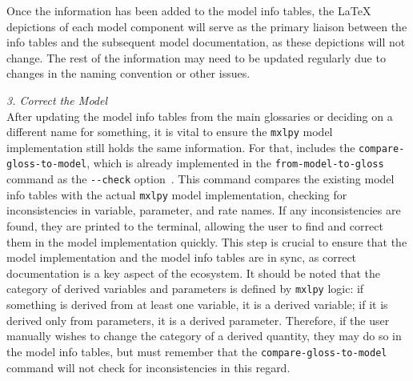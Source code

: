 Once the information has been added to the model info tables, the \LaTeX{} depictions of each model component will serve as the primary liaison between the info tables and the subsequent model documentation, as these depictions will not change. The rest of the information may need to be updated regularly due to changes in the naming convention or other issues.

\emph{3. Correct the Model}\\
After updating the model info tables from the main glossaries or deciding on a different name for something, it is vital to ensure the \verb|mxlpy| model implementation still holds the same information. For that, \greensloth[GreenSlothUtils] includes the \verb|compare-gloss-to-model|, which is already implemented in the \verb|from-model-to-gloss| command as the \verb|--check| option~. This command compares the existing model info tables with the actual \verb|mxlpy| model implementation, checking for inconsistencies in variable, parameter, and rate names. If any inconsistencies are found, they are printed to the terminal, allowing the user to find and correct them in the model implementation quickly. This step is crucial to ensure that the model implementation and the model info tables are in sync, as correct documentation is a key aspect of the \greensloth{} ecosystem. It should be noted that the category of derived variables and parameters is defined by \verb|mxlpy| logic: if something is derived from at least one variable, it is a derived variable; if it is derived only from parameters, it is a derived parameter. Therefore, if the user manually wishes to change the category of a derived quantity, they may do so in the model info tables, but must remember that the \verb|compare-gloss-to-model| command will not check for inconsistencies in this regard.

